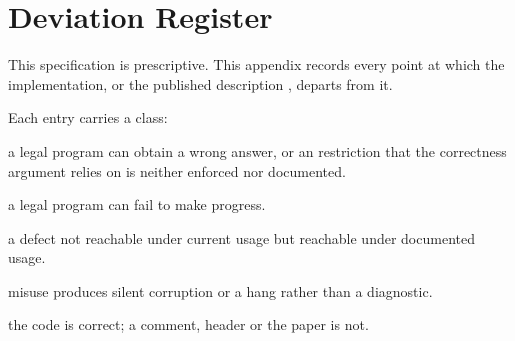 \chapter{Deviation Register}
\label{ch:deviations}

This specification is prescriptive. This appendix records every point at which
the implementation, or the published description \cite{dstm2026}, departs from
it.

Each entry carries a class:

\begin{description}[leftmargin=2.4cm,style=nextline,font=\normalfont\bfseries]
  \item[\textnormal{\textbf{soundness}}] a legal program can obtain a wrong
    answer, or an restriction that the correctness argument relies on is
    neither enforced nor documented.
  \item[\textnormal{\textbf{liveness}}] a legal program can fail to make
    progress.
  \item[\textnormal{\textbf{latent}}] a defect not reachable under current
    usage but reachable under documented usage.
  \item[\textnormal{\textbf{robustness}}] misuse produces silent corruption or
    a hang rather than a diagnostic.
  \item[\textnormal{\textbf{documentation}}] the code is correct; a comment,
    header or the paper is not.
\end{description}

